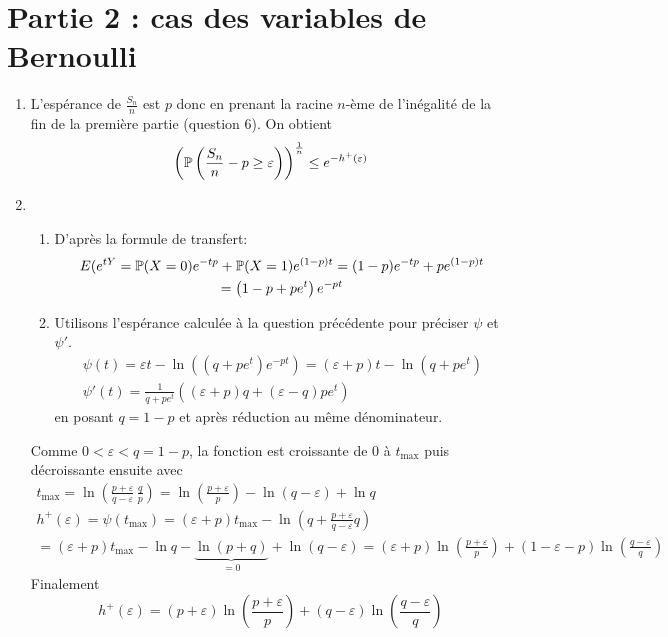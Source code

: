 \section*{Partie 2 : cas des variables de Bernoulli }
\begin{enumerate}
 \item L'espérance de $\frac{S_n}{n}$ est $p$ donc en prenant la racine $n$-ème de l'inégalité de la fin de la première partie (question 6). On obtient
\begin{displaymath}
 \left( \P\left( \frac{S_n}{n} -p \geq \varepsilon \right) \right)^{\frac{1}{n}} \leq e^{-h^+(\varepsilon)}
\end{displaymath}

 \item 
\begin{enumerate}
 \item D'après la formule de transfert:
\begin{multline*}
 E(e^{tY} = \P(X=0)e^{-tp} + \P(X=1)e^{(1-p)t}
 = (1-p)e^{-tp} + pe^{(1-p)t} \\
 = \left( 1-p + pe^{t}\right)e^{-pt} 
\end{multline*}

 \item Utilisons l'espérance calculée à la question précédente pour préciser $\psi$ et $\psi'$.
\begin{multline*}
\psi(t) = \varepsilon t - \ln\left( \left( q + pe^{t}\right)e^{-pt}\right) 
= (\varepsilon + p) t - \ln(q + pe^t) \\ 
\psi'(t) = \frac{1}{q+pe^t}\left( (\varepsilon + p)q +(\varepsilon -q) pe^t\right) 
\end{multline*}
en posant $q=1-p$ et après réduction au même dénominateur.
\end{enumerate}
Comme $0 < \varepsilon < q = 1-p$, la fonction est croissante de $0$ à $t_{\text{max}}$ puis décroissante ensuite avec
\begin{multline*}
 t_{\text{max}} = \ln \left( \frac{p + \varepsilon}{q-\varepsilon}\, \frac{q}{p} \right) =  \ln\left( \frac{p+\varepsilon}{p}\right) -\ln(q-\varepsilon) + \ln q\\
h^+(\varepsilon) = \psi(t_{\text{max}})
= (\varepsilon +p)t_{\text{max}} - \ln\left( q + \frac{p+\varepsilon}{q-\varepsilon}q\right)\\
= (\varepsilon +p)t_{\text{max}} -\ln q - \underset{=0}{\underbrace{\ln(p+q)}} + \ln(q-\varepsilon)
= (\varepsilon +p)\ln\left( \frac{p+\varepsilon}{p}\right) + (1-\varepsilon -p)\ln\left( \frac{q-\varepsilon}{q}\right) 
\end{multline*}
Finalement
\begin{displaymath}
h^+(\varepsilon) =  (p+\varepsilon)\ln\left( \frac{p+\varepsilon}{p}\right) + (q-\varepsilon)\ln\left( \frac{q-\varepsilon}{q}\right)
\end{displaymath}



\end{enumerate}
